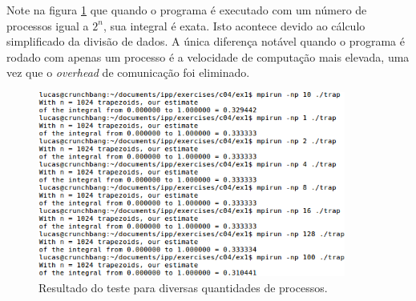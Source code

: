 \documentclass[11pt,a4paper,onecolumn]{article}
\begin{document}
Note na figura \ref{fig:ex1} que quando o programa é executado com um número de processos igual a $2^n$, sua integral é exata.
Isto acontece devido ao cálculo simplificado da divisão de dados.
A única diferença notável quando o programa é rodado com apenas um processo é a velocidade de computação mais elevada, uma vez que o \textit{overhead} de comunicação foi eliminado.

\begin{figure}[h!]
  \centering
  \includegraphics[width=0.9\textwidth]{../ex1/SaidaEx1}
  \caption{Resultado do teste para diversas quantidades de processos.}
  \label{fig:ex1}
\end{figure}
\end{document}
